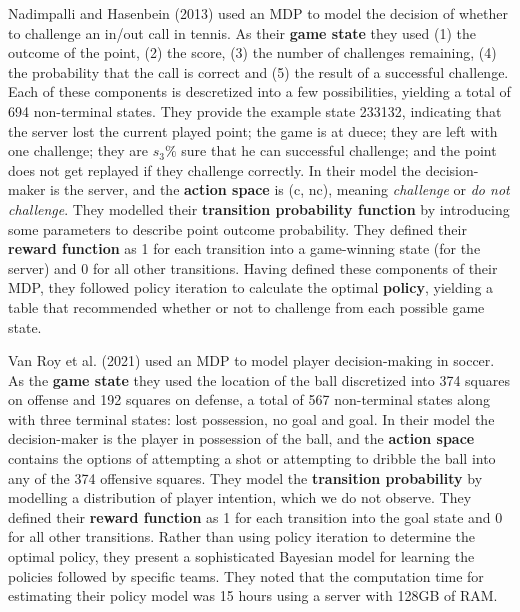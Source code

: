 \documentclass{article}
\begin{document}
    Nadimpalli and Hasenbein (2013) used an MDP to model the decision of whether to challenge an in/out call in tennis. As their {\bf game state} they used (1) the outcome of the point, (2) the score, (3) the number of challenges remaining, (4) the probability that the call is correct and (5) the result of a successful challenge. Each of these components is descretized into a few possibilities, yielding a total of 694 non-terminal states. They provide the example state 233132, indicating that the server lost the current played point; the game is at duece; they are left with one challenge; they are $s_3\%$ sure that he can successful challenge; and the point does not get replayed if they challenge correctly. In their model the decision-maker is the server, and the {\bf action space} is (c, nc), meaning {\it challenge} or {\it do not challenge}. They modelled their {\bf transition probability function} by introducing some parameters to describe point outcome probability. They defined their {\bf reward function} as 1 for each transition into a game-winning state (for the server) and 0 for all other transitions. Having defined these components of their MDP, they followed policy iteration to calculate the optimal {\bf policy}, yielding a table that recommended whether or not to challenge from each possible game state.

    Van Roy et al. (2021) used an MDP to model player decision-making in soccer. As the {\bf game state} they used the location of the ball discretized into 374 squares on offense and 192 squares on defense, a total of 567 non-terminal states along with three terminal states: lost possession, no goal and goal. In their model the decision-maker is the player in possession of the ball, and the {\bf action space} contains the options of attempting a shot or attempting to dribble the ball into any of the 374 offensive squares. They model the {\bf transition probability} by modelling a distribution of player intention, which we do not observe. They defined their {\bf reward function} as 1 for each transition into the goal state and 0 for all other transitions. Rather than using policy iteration to determine the optimal policy, they present a sophisticated Bayesian model for learning the policies followed by specific teams. They noted that the computation time for estimating their policy model was 15 hours using a server with 128GB of RAM.
\end{document}
